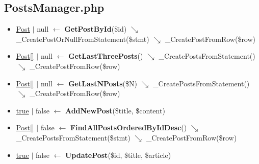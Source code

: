 \subsection{PostsManager.php}
\begin{itemize}
  \setlength\itemsep{0em}
  \item \underline{Post} $\vert$ null $\leftarrow$ \textbf{GetPostById}(\$id) $\searrow$ \_CreatePostOrNullFromStatement(\$stmt) $\searrow$ \_CreatePostFromRow(\$row)
  \item \underline{Post[]} $\vert$ null $\leftarrow$ \textbf{GetLastThreePosts}() $\searrow$ \_CreatePostsFromStatement() $\searrow$ \_CreatePostFromRow(\$row)
  \item \underline{Post[]} $\vert$ null $\leftarrow$ \textbf{GetLastNPosts}(\$N) $\searrow$ \_CreatePostsFromStatement() $\searrow$ \_CreatePostFromRow(\$row)
  \item \underline{true} $\vert$ false $\leftarrow$ \textbf{AddNewPost}(\$title, \$content)
  \item \underline{Post[]} $\vert$ false $\leftarrow$ \textbf{FindAllPostsOrderedByIdDesc}() $\searrow$ \_CreatePostsFromStatement(\$stmt) $\searrow$ \_CreatePostFromRow(\$row)
  \item \underline{true} $\vert$ false $\leftarrow$ \textbf{UpdatePost}(\$id, \$title, \$article)
\end{itemize}
